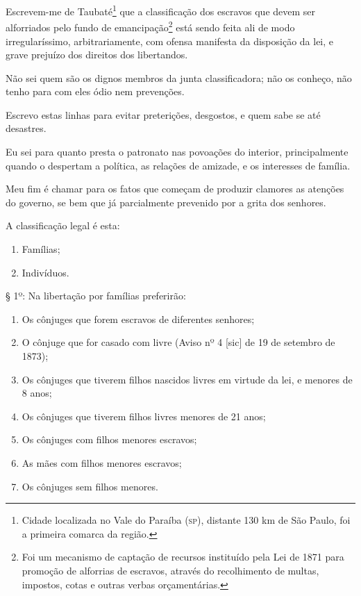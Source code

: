 Escrevem-me de Taubaté\footnote{Cidade localizada no Vale do Paraíba
  (\textsc{sp}), distante 130 km de São Paulo, foi a primeira comarca da região.}
que a classificação dos escravos que devem ser alforriados pelo fundo de
emancipação\footnote{Foi um mecanismo de captação de recursos
  instituído pela Lei de 1871 para promoção de alforrias de escravos,
  através do recolhimento de multas, impostos, cotas e outras verbas
  orçamentárias.} está sendo feita ali de modo irregularíssimo,
arbitrariamente, com ofensa manifesta da disposição da lei, e grave
prejuízo dos direitos dos libertandos.

Não sei quem são os dignos membros da junta classificadora; não os
conheço, não tenho para com eles ódio nem prevenções.

Escrevo estas linhas para evitar preterições, desgostos, e quem sabe se
até desastres.

Eu sei para quanto presta o patronato nas povoações do interior,
principalmente quando o despertam a política, as relações de amizade, e
os interesses de família.

Meu fim é chamar para os fatos que começam de produzir clamores as
atenções do governo, se bem que já parcialmente prevenido por a grita
dos senhores.

A classificação legal é esta:

\begin{enumerate}[label={\scshape\roman*.}]
\item Famílias;

\item Indivíduos.
\end{enumerate}

§ 1º: Na libertação por famílias preferirão:
\begin{enumerate}[label={\scshape\roman*.}]
\item Os cônjuges que forem escravos de diferentes senhores;

\item O cônjuge que for casado com livre (Aviso nº 4 {[}sic{]} de 19
de setembro de 1873);

\item Os cônjuges que tiverem filhos nascidos livres em virtude da lei, e
menores de 8 anos;

\item Os cônjuges que tiverem filhos livres menores de 21 anos;

\item Os cônjuges com filhos menores escravos;

\item As mães com filhos menores escravos;

\item Os cônjuges sem filhos menores.
\end{enumerate}

